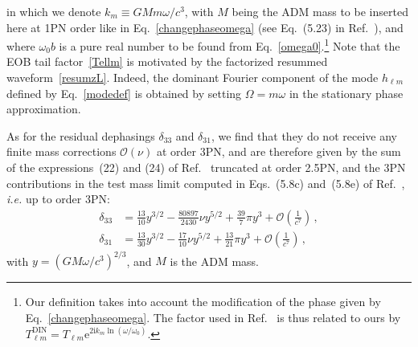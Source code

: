 \documentclass[prd,preprint,superscriptaddress,tightenlines,nofootinbib,
  eqsecnum,showpacs]{revtex4}
\newcommand{\ui}{\mathrm{i}}
\begin{document}
%
in which we denote $k_m \equiv G M m \omega/c^3$, with $M$ being the ADM mass
to be inserted here at 1PN order like in Eq.~\eqref{changephaseomega} (see
Eq.~(5.23) in Ref.~\cite{BFIS08}), and where $\omega_0 b$ is a pure real
number to be found from Eq.~\eqref{omega0}.\footnote{Our definition takes into
  account the modification of the phase given by Eq.~\eqref{changephaseomega}.
  The factor used in Ref.~\cite{DIN09} is thus related to ours by
  $T^\text{DIN}_{\ell m}=T_{\ell m}\mathrm{e}^{2\ui
    k_m\ln(\omega/\omega_0)}$.} Note that the EOB tail factor~\eqref{Tellm} is
motivated by the factorized resummed waveform~\eqref{resumzL}. Indeed, the
dominant Fourier component of the mode $h_{\ell m}$ defined by
Eq.~\eqref{modedef} is obtained by setting $\Omega = m \omega$ in the
stationary phase approximation.

As for the residual dephasings $\delta_{33}$ and $\delta_{31}$, we
find that they do not receive any finite mass corrections
$\mathcal{O}(\nu)$ at order 3PN, and are therefore given by the sum of
the expressions~(22) and (24) of Ref.~\cite{DIN09} truncated at order
2.5PN, and the 3PN contributions in the test mass limit computed in
Eqs.~(5.8c) and~(5.8e) of Ref.~\cite{FI10}, \textit{i.e.} up to order
3PN:
%
\begin{subequations}\label{deltalm}
\begin{align}
\delta_{33} &= \frac{13}{10} y^{3/2} - \frac{80897}{2430} \nu y^{5/2}
+ \frac{39}{7}\pi y^3 +
\mathcal{O}\left(\frac{1}{c^7}\right)\,,\\ \delta_{31} &=
\frac{13}{30} y^{3/2} - \frac{17}{10}\nu y^{5/2} + \frac{13}{21}\pi
y^3 + \mathcal{O}\left(\frac{1}{c^7}\right)\,,
\end{align}\end{subequations}
%
with $y = (G M \omega/c^3)^{2/3}$, and $M$ is the ADM mass.
\end{document}
